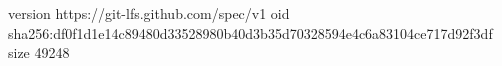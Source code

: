 version https://git-lfs.github.com/spec/v1
oid sha256:df0f1d1e14c89480d33528980b40d3b35d70328594e4c6a83104ce717d92f3df
size 49248
